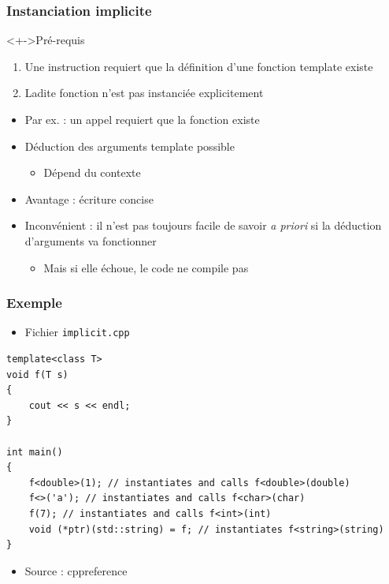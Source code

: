 \begin{frame}
\frametitle{Instanciation implicite}
\begin{exampleblock}<+->{Pré-requis}
	\begin{enumerate}[<+->]
	\item Une instruction requiert que la définition d'une fonction template existe
	\item Ladite fonction n'est pas instanciée explicitement
	\end{enumerate}
\end{exampleblock}
\begin{itemize}[<+->]
\item Par ex. : un appel requiert que la fonction existe
\item Déduction des arguments template possible
	\begin{itemize}
	\item Dépend du contexte
	\end{itemize}
\item Avantage : écriture concise
\item Inconvénient : il n'est pas toujours facile de savoir \emph{a priori} si la déduction d'arguments va fonctionner
	\begin{itemize}
	\item Mais si elle échoue, le code ne compile pas
	\end{itemize}
\end{itemize}
\end{frame}

\begin{frame}[containsverbatim]
\frametitle{Exemple}
\begin{itemize}
\item Fichier \texttt{implicit.cpp}
\end{itemize}
\begin{lstlisting}
template<class T>
void f(T s)
{
    cout << s << endl;
}
 
int main()
{
    f<double>(1); // instantiates and calls f<double>(double)
    f<>('a'); // instantiates and calls f<char>(char)
    f(7); // instantiates and calls f<int>(int)
    void (*ptr)(std::string) = f; // instantiates f<string>(string)
}
\end{lstlisting}
\begin{itemize}
\item Source : cppreference
\end{itemize}
\end{frame}

